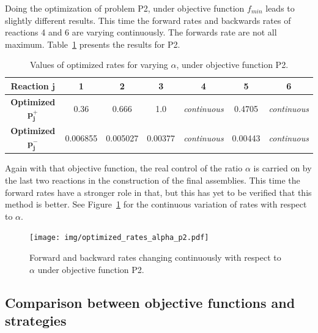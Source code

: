     Doing the optimization of problem P2, under objective function $f_{min}$ leads to slightly different results. This time the forward rates and backwards rates of reactions 4 and 6 are varying continuously. The forwards rate are not all maximum. Table~\ref{tab:optimized_rates_p2} presents the results for P2.

    \begin{table}
        \begin{center}
        \begin{tabular}{|c|c|c|c|c|c|c|}
            \hline
            \textbf{Reaction} $\mathbf{j}$ & \textbf{1} & \textbf{2} & \textbf{3} & \textbf{4} & \textbf{5} & \textbf{6} \\
            \hline
            \textbf{Optimized} $\mathbf{p^+_j}$ & 0.36 & 0.666 & 1.0 & \textit{continuous} & 0.4705 & \textit{continuous}\\
            \hline
            \textbf{Optimized} $\mathbf{p^-_j}$ & 0.006855 & 0.005027 & 0.00377 & \textit{continuous} &  0.00443 & \textit{continuous} \\
            \hline
        \end{tabular}
        \end{center}
        \caption{Values of optimized rates for varying $\alpha$, under objective function P2.}
        \label{tab:optimized_rates_p2}
    \end{table}

    Again with that objective function, the real control of the ratio $\alpha$ is carried on by the last two reactions in the construction of the final assemblies. This time the forward rates have a stronger role in that, but this has yet to be verified that this method is better. See Figure~\ref{fig:img_optimized_rates_alpha_p2} for the continuous variation of rates with respect to $\alpha$.

    \begin{figure}[h]
        \centering
            \texttt{[image: img/optimized\_rates\_alpha\_p2.pdf]}
        \caption{Forward and backward rates changing continuously with respect to $\alpha$ under objective function P2.}
        \label{fig:img_optimized_rates_alpha_p2}
    \end{figure}

    \subsection{Comparison between objective functions and strategies} %
    \label{sub:comparison_between_objective_functions_and_strategies}

